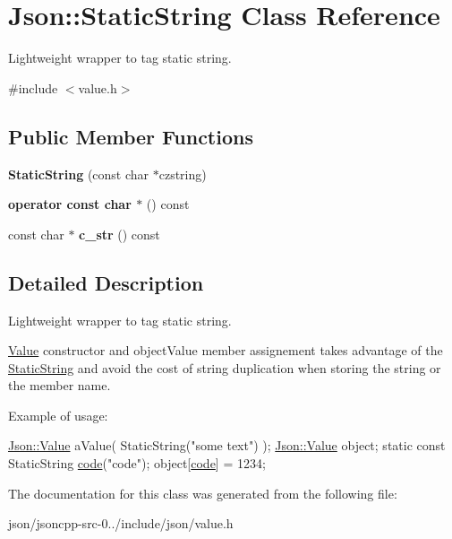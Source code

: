 \hypertarget{class_json_1_1_static_string}{\section{Json\+:\+:Static\+String Class Reference}
\label{class_json_1_1_static_string}
}


Lightweight wrapper to tag static string.  




{\ttfamily \#include $<$value.\+h$>$}

\subsection*{Public Member Functions}
\begin{DoxyCompactItemize}
\item 
\hypertarget{class_json_1_1_static_string_afb6baf1ec078ce76f0b0f9b39d19437f}{{\bfseries Static\+String} (const char $\ast$czstring)}\label{class_json_1_1_static_string_afb6baf1ec078ce76f0b0f9b39d19437f}

\item 
\hypertarget{class_json_1_1_static_string_ac2b334d46bbea4c0227e508fc66433e9}{{\bfseries operator const char $\ast$} () const }\label{class_json_1_1_static_string_ac2b334d46bbea4c0227e508fc66433e9}

\item 
\hypertarget{class_json_1_1_static_string_ab86fc6a3183adf12fdba4b370acf1754}{const char $\ast$ {\bfseries c\+\_\+str} () const }\label{class_json_1_1_static_string_ab86fc6a3183adf12fdba4b370acf1754}

\end{DoxyCompactItemize}


\subsection{Detailed Description}
Lightweight wrapper to tag static string. 

\hyperlink{class_json_1_1_value}{Value} constructor and object\+Value member assignement takes advantage of the \hyperlink{class_json_1_1_static_string}{Static\+String} and avoid the cost of string duplication when storing the string or the member name.

Example of usage\+: 
\begin{DoxyCode}
\hyperlink{class_json_1_1_value}{Json::Value} aValue( StaticString(\textcolor{stringliteral}{"some text"}) );
\hyperlink{class_json_1_1_value}{Json::Value} object;
\textcolor{keyword}{static} \textcolor{keyword}{const} StaticString \hyperlink{structcode}{code}(\textcolor{stringliteral}{"code"});
\textcolor{keywordtype}{object}[\hyperlink{structcode}{code}] = 1234;
\end{DoxyCode}
 

The documentation for this class was generated from the following file\+:\begin{DoxyCompactItemize}
\item 
json/jsoncpp-\/src-\/0../include/json/value.\+h\end{DoxyCompactItemize}
